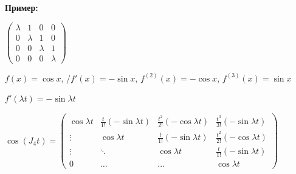 \textbf{Пример:}


$\begin{pmatrix}
    \lambda & 1 & 0 & 0 \\
    0 & \lambda & 1 & 0\\
    0 & 0 & \lambda & 1\\
    0 & 0 & 0 & \lambda
\end{pmatrix}$

$f(x)=\cos x$, /$f'{(x)} = - \sin x$, $f^{(2)}{(x)} = - \cos x$, $f^{(3)}{(x)} =  \sin x$

$f'(\lambda t)=- \sin \lambda t$

$\cos (J_4t) = \begin{pmatrix}
    \cos \lambda t & \frac{t}{1!}(-\sin \lambda t) &\frac{t^2}{2!}(-\cos \lambda t) & \frac{t^3}{3!}(-\sin \lambda t)\\
    \vdots & \cos \lambda t & \frac{t}{1!}(-\sin \lambda t) &\frac{t^2}{2!}(-\cos \lambda t) \\
    \vdots & \ddots & \cos \lambda t & \frac{t}{1!}(-\sin \lambda t) \\
    0 & \ldots & \ldots & \cos \lambda t
\end{pmatrix}$






